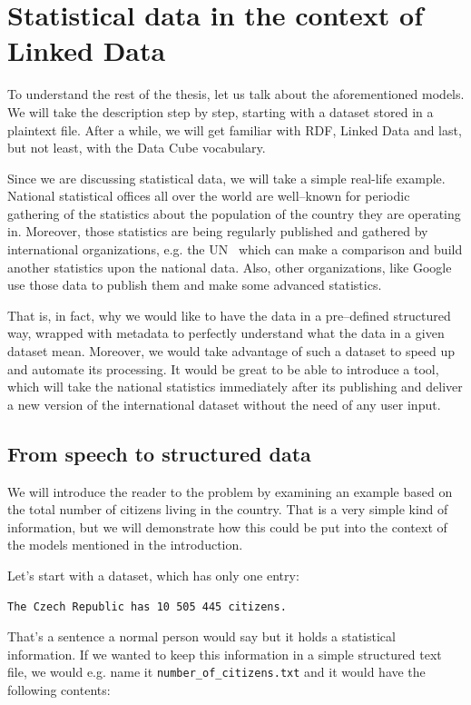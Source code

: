 \chapter{Statistical data in the context of Linked Data}
\label{ch:statistical-data}
To understand the rest of the thesis, let us talk about the aforementioned models.
We will take the description step by step, starting with a dataset stored in a plaintext file.
After a while, we will get familiar with RDF, Linked Data and last, but not least, with the
Data Cube vocabulary.

Since we are discussing statistical data, we will take a simple real-life example.
National statistical offices all over the world are well--known for periodic gathering of the
statistics about the population of the country they are operating in. Moreover, 
those statistics are being regularly published and gathered by international 
organizations, e.g. the UN~\cite{un} which can make a comparison and build 
another statistics upon the national data. Also, other organizations, like 
Google~\cite{pubdata} use those data to publish them and make 
some advanced statistics.

That is, in fact, why we would like to have the data in a pre--defined structured 
way, wrapped with metadata to perfectly understand what the data in a given 
dataset mean. Moreover, we would take advantage of such a dataset to speed up 
and automate its processing. It would be great to be able to introduce a tool, 
which will take the national statistics immediately after its publishing and 
deliver a new version of the international dataset without the need of any user 
input.

\section{From speech to structured data}

We will introduce the reader to the problem by examining an example based on the total number of
citizens living in the country. That is a very simple kind of information, but we will demonstrate
how this could be put into the context of the models mentioned in the introduction.

Let’s start with a dataset, which has only one entry:

\begin{verbatim}
The Czech Republic has 10 505 445 citizens.
\end{verbatim}

That’s a sentence a normal person would say but it holds a statistical information.
If we wanted to keep this information in a simple structured text file, we would e.g. name it
\texttt{number\_of\_citizens.txt} and it would have the following contents:


